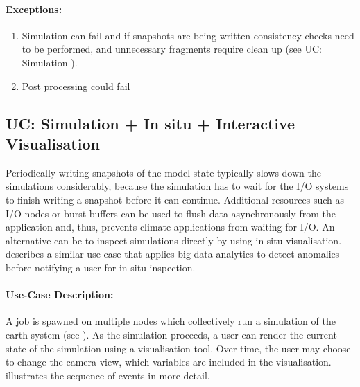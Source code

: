 \paragraph{Exceptions:}
\begin{enumerate}
	\item Simulation can fail and if snapshots are being written consistency checks need to be performed, and unnecessary fragments require clean up (see UC: Simulation ).
	\item Post processing could fail
\end{enumerate}





\subsection{UC: Simulation + In situ + Interactive Visualisation}
\label{uc: simulation + in-situ + cam}


Periodically writing snapshots of the model state typically slows down the simulations considerably, because the simulation has to wait for the I/O systems to finish writing a snapshot before it can continue.
Additional resources such as I/O nodes or burst buffers can be used to flush data asynchronously from the application and, thus, prevents climate applications from waiting for I/O.
An alternative can be to inspect simulations directly by using in-situ visualisation.
 describes a similar use case that applies big data analytics to detect anomalies before notifying a user for in-situ inspection.


\paragraph{Use-Case Description:}
A job is spawned on multiple nodes which collectively run a simulation of the earth system (see ).
As the simulation proceeds, a user can render the current state of the simulation using a visualisation tool.
Over time, the user may choose to change the camera view, which variables are included in the visualisation.
 illustrates the sequence of events in more detail.

